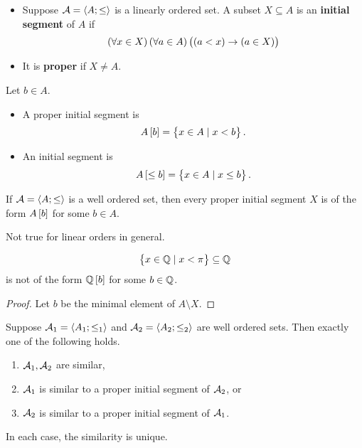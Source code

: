 \begin{definition}
\hfill
\begin{itemize}
\item Suppose $ \AA = \abr{A; \le} $ is a linearly ordered set. A subset $ X \subseteq A $ is an \textbf{initial segment} of $ A $ if
$$ \fab{x \in X}\fab{a \in A}\impb{\ltb{a}{x}}{\inb{a}{X}} $$
\item It is \textbf{proper} if $ X \ne A $.
\end{itemize}
\end{definition}

\begin{example*}
Let $ b \in A $.
\begin{itemize}
\item A proper initial segment is
$$ A\sbr{b} = \cbr{x \in A \mid x < b}. $$
\item An initial segment is
$$ A\sbr{\le b} = \cbr{x \in A \mid x \le b}. $$
\end{itemize}
\end{example*}

\begin{lemma}
\label{lem:3.3.6}
If $ \AA = \abr{A; \le} $ is a well ordered set, then every proper initial segment $ X $ is of the form $ A\sbr{b} $ for some $ b \in A $.
\end{lemma}

\begin{remark*}
Not true for linear orders in general.
\end{remark*}

\begin{example*}
$$ \cbr{x \in \Q \mid x < \pi} \subseteq \Q $$
is not of the form $ \Q\sbr{b} $ for some $ b \in \Q $.
\end{example*}

\begin{proof}
Let $ b $ be the minimal element of $ A \setminus X $.
\end{proof}

\begin{theorem}
\label{thm:3.3.7}
Suppose $ \AA_1 = \abr{A_1; \le_1} $ and $ \AA_2 = \abr{A_2; \le_2} $ are well ordered sets. Then exactly one of the following holds.
\begin{enumerate}
\item $ \AA_1, \AA_2 $ are similar,
\item $ \AA_1 $ is similar to a proper initial segment of $ \AA_2 $, or
\item $ \AA_2 $ is similar to a proper initial segment of $ \AA_1 $.
\end{enumerate}
In each case, the similarity is unique.
\end{theorem}

